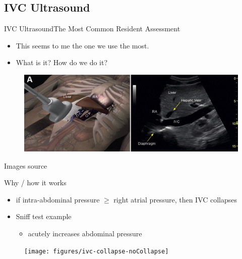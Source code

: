 \documentclass{beamer}
\begin{document}
		\subsection{IVC Ultrasound}
			\begin{frame}{IVC Ultrasound}{The Most Common Resident Assessment}
				\begin{itemize}
					\item This seems to me the one we use the most.
					\item What is it? How do we do it?
				\end{itemize}
			\pause
			\begin{figure}
				\centering
				\includegraphics[width=1.0\textwidth]{figures/ivc-external-view}
				\label{fig:fluidstrategy}
			\end{figure}
			\tiny{Images source} \cite{DeBacker2014}
			\end{frame}
			\begin{frame}{Why / how it works}
				\begin{itemize}
					\item if intra-abdominal pressure $\geq $ right atrial pressure, then IVC collapses
					\item Sniff test example
					\begin{itemize}
						\item acutely increases abdominal pressure
					\end{itemize}
				\end{itemize}
				\pause
				\begin{figure}
					\centering
					\texttt{[image: figures/ivc-collapse-noCollapse]}
					\label{fig:fluidstrategy}
				\end{figure}
			\end{frame}
\end{document}
